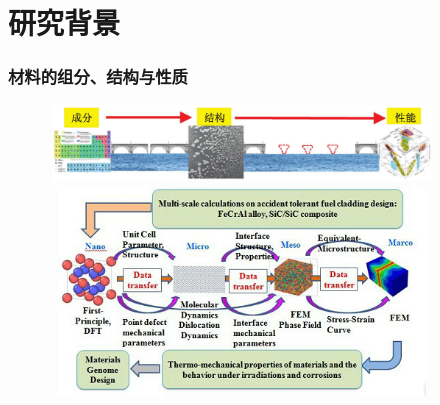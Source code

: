 \small
\section{研究背景}
\begin{frame}
	\frametitle{材料的组分、结构与性质}
\begin{figure}[h!]
\vspace*{-0.3in}
\includegraphics[height=0.80in,width=4.05in]{Figures/MGE-2.png}
\vspace*{-0.10in}
\includegraphics[height=2.20in,width=4.05in]{Figures/Multi_Scale-5.jpg}
\label{Multi-Scale-2}
\end{figure}
\end{frame}

